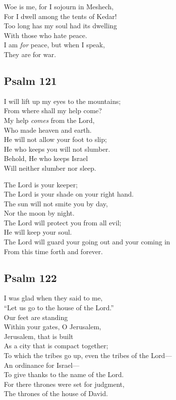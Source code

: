 \documentclass[14pt]{extbook}
\begin{document}
Woe is me, for I sojourn in Meshech,\\
For I dwell among the tents of Kedar!\\
Too long has my soul had its dwelling\\
With those who hate peace.\\
I am \emph{for} peace, but when I speak,\\
They are for war.

\hypertarget{psalm-121}{%
\subsection{Psalm 121}\label{psalm-121}}

I will lift up my eyes to the mountains;\\
From where shall my help come?\\
My help \emph{comes} from the Lord,\\
Who made heaven and earth.\\
He will not allow your foot to slip;\\
He who keeps you will not slumber.\\
Behold, He who keeps Israel\\
Will neither slumber nor sleep.

The Lord is your keeper;\\
The Lord is your shade on your right hand.\\
The sun will not smite you by day,\\
Nor the moon by night.\\
The Lord will protect you from all evil;\\
He will keep your soul.\\
The Lord will guard your going out and your coming in\\
From this time forth and forever.

\newpage
\hypertarget{psalm-122}{%
\subsection{Psalm 122}\label{psalm-122}}

I was glad when they said to me,\\
``Let us go to the house of the Lord.''\\
Our feet are standing\\
Within your gates, O Jerusalem,\\
Jerusalem, that is built\\
As a city that is compact together;\\
To which the tribes go up, even the tribes of the Lord---\\
An ordinance for Israel---\\
To give thanks to the name of the Lord.\\
For there thrones were set for judgment,\\
The thrones of the house of David.
\end{document}
